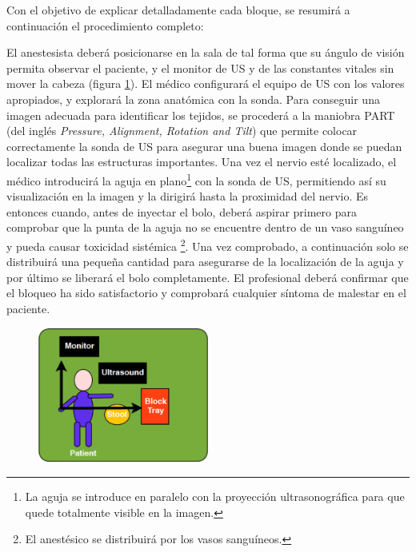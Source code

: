 Con el objetivo de explicar detalladamente cada bloque, se resumirá a continuación el procedimiento completo:

El anestesista deberá posicionarse en la sala de tal forma que su ángulo de visión permita observar el paciente, y el monitor de \ac{US} y de las constantes vitales sin mover la cabeza (figura \ref{fig:roomplace}). El médico configurará el equipo de \ac{US} con los valores apropiados, y explorará la zona anatómica con la sonda. Para conseguir una imagen adecuada para identificar los tejidos, se procederá a la maniobra PART (del inglés \emph{Pressure, Alignment, Rotation and Tilt}) que permite colocar correctamente la sonda de \ac{US} para asegurar una buena imagen donde se puedan localizar todas las estructuras importantes. Una vez el nervio esté localizado, el médico introducirá la aguja en plano\footnote{La aguja se introduce en paralelo con la proyección ultrasonográfica para que quede totalmente visible en la imagen.} con la sonda de \ac{US}, permitiendo así su visualización en la imagen y la dirigirá hasta la proximidad del nervio. Es entonces cuando, antes de inyectar el bolo, deberá aspirar primero para comprobar que la punta de la aguja no se encuentre dentro de un vaso sanguíneo y pueda causar toxicidad sistémica \footnote{El anestésico se distribuirá por los vasos sanguíneos.}. Una vez comprobado, a continuación solo se distribuirá una pequeña cantidad para asegurarse de la localización de la aguja y por último se liberará el bolo completamente. El profesional deberá confirmar que el bloqueo ha sido satisfactorio y comprobará cualquier síntoma de malestar en el paciente.


\begin{figure}[th]
   \centering
    \includegraphics[width=0.5\textwidth]{IMG/roomplacement.png}
    \caption{ }
   \label{fig:roomplace}
\end{figure}






